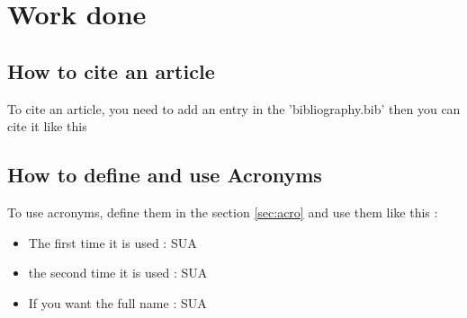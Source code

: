\section{Work done}
\label{sec:travail}

\subsection{How to cite an article}
To cite an article, you need to add an entry in the 'bibliography.bib' then you can cite it like this \cite{dummy_article}


\subsection{How to define and use Acronyms}
To use acronyms, define them in the section \ref{sec:acro} and use them like this :
\begin{itemize}
    \item The first time it is used : \ac{SUA}
    \item the second time it is used : \ac{SUA}
    \item If you want the full name : \acf{SUA}
\end{itemize}


